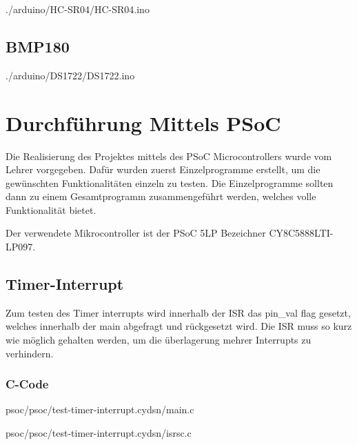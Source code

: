 \documentclass[12pt,a4paper,german]{article}
\begin{document}

 {./arduino/HC-SR04/HC-SR04.ino}

\newpage
\subsection{BMP180}


 {./arduino/DS1722/DS1722.ino}

\newpage
\section{Durchführung Mittels PSoC}

	Die Realisierung des Projektes mittels des PSoC Microcontrollers wurde
	vom Lehrer vorgegeben. Dafür wurden zuerst Einzelprogramme erstellt,
	um die gewünschten Funktionalitäten einzeln zu testen. Die
	Einzelprogramme sollten dann zu einem Gesamtprogramm zusammengeführt
	werden, welches volle Funktionalität bietet.

	Der verwendete Mikrocontroller ist der PSoC 5LP Bezeichner 
	CY8C5888LTI-LP097.

\subsection{Timer-Interrupt}

Zum testen des Timer interrupts wird innerhalb der ISR das pin\_val flag gesetzt,
welches innerhalb der main abgefragt und rückgesetzt wird. Die ISR muss so kurz
wie möglich gehalten werden, um die überlagerung mehrer Interrupts zu
verhindern.

\subsubsection{C-Code}


	{psoc/psoc/test-timer-interrupt.cydsn/main.c}

	{psoc/psoc/test-timer-interrupt.cydsn/isrsc.c}
\end{document}
